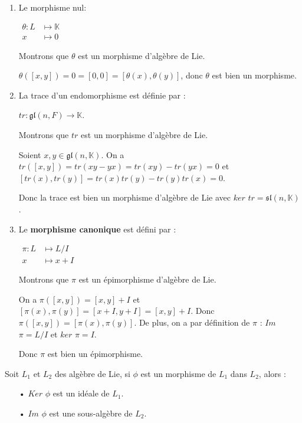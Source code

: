 \documentclass[a4paper,openany,12pt]{report}
\newcommand{\KK}{\mathbb{K}}
\newcommand{\gl}{\mathfrak{gl}}
\newcommand{\ssl}{\mathfrak{sl}}
\theoremstyle{break}
{\theorembodyfont{\upshape}
\newtheorem*{rmq}{Remarque :}
\newtheorem*{prv}{Preuve :}
\newtheorem*{ex}{Exemples :}
\newtheorem{exe}{Exemple : }
\newtheorem*{nota}{Notation :}}
\begin{document}
\begin{ex}
\begin{enumerate}

\item Le morphisme nul:
\begin{center} 
$\begin{aligned} \theta: L & \longmapsto \KK \\ x & \longmapsto 0 \end{aligned}$
\end{center}
Montrons que $\theta$ est un morphisme d'algèbre de Lie.

$\theta([x,y]) = 0 = [0,0] = [\theta(x),\theta(y)]$, donc $\theta$ est bien un morphisme.

\item La trace d'un endomorphisme est définie par :
\begin{center}
$tr: \gl(n,F) \longrightarrow \KK$.
\end{center}
Montrons que $tr$ est un morphisme d’algèbre de Lie.

Soient $x,y \in  \gl(n,\KK)$. On a $tr([x,y]) = tr(xy-yx) = tr(xy)-tr(yx) = 0$
et $[tr(x),tr(y)] = tr(x)tr(y)-tr(y)tr(x) = 0$.

Donc la trace est bien un morphisme d'algèbre de Lie avec $ker$ $tr = \ssl(n,\KK)$.

\item Le \textbf{morphisme canonique} est défini par : 
\begin{center}
$\begin{aligned} \pi: L & \longmapsto L/I \\ x & \longmapsto x+I\end{aligned}$
\end{center}
Montrons que $\pi$ est un épimorphisme d'algèbre de Lie.

On a $\pi([x,y]) = [x,y]+I$ et $[\pi(x),\pi(y)] = [x+I,y+I] = [x,y]+I$. Donc $\pi([x,y]) = [\pi(x),\pi(y)]$. De plus, on a par définition de $\pi$ : $Im$ $\pi = L/I$ et $ker$ $\pi = I$.

Donc $\pi$ est bien un épimorphisme.
\end{enumerate}
\end{ex}

\begin{rmq}
\quad Soit $L_{1}$ et $L_{2}$ des algèbre de Lie, si $\phi$ est un morphisme de $L_{1}$ dans $L_{2}$, alors :
\begin{itemize}
\item[•] $Ker$ $\phi$ est un idéale de $L_{1}$.
\item[•] $Im$ $\phi$ est une sous-algèbre de $L_{2}$.
\end{itemize}
\end{rmq}
\end{document}
